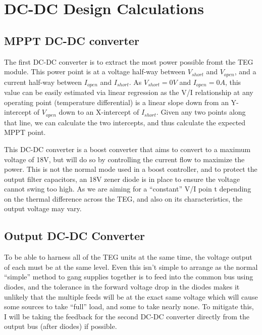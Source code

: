 \documentclass{report}
\begin{document}
\eject
\setcounter{page}{1}
\pagestyle{headings}

\setcounter{chapter}{0}
\renewcommand\chaptername{Chapter}
\renewcommand\thechapter{\arabic{chapter}}

\chapter{DC-DC Design Calculations}
\section{MPPT DC-DC converter}

The first DC-DC converter is to extract the most power possible fromt the TEG
module.  This power point is at a voltage half-way between $V_{short}$ and
$V_{open}$, and a current half-way between $I_{open}$ and $I_{short}$.  As
$V_{short} = 0V$ and $I_{open} = 0A$, this value can be easily estimated via
linear regression as the V/I relationship at any operating point (temperature
differential) is a linear slope down from an Y-intercept of $V_{open}$ down to
an X-intercept of $I_{short}$.  Given any two points along that line, we can
calculate the two intercepts, and thus calculate the expected MPPT point.

This DC-DC converter is a boost converter that aims to convert to a maximum
voltage of 18V, but will do so by controlling the current flow to maximize the
power.  This is not the normal mode used in a boost controller, and to protect
the output filter capacitors, an 18V zener diode is in place to ensure the 
voltage cannot swing too high.  As we are aiming for a ``constant'' V/I poin t
depending on the thermal difference across the TEG, and also on its
characteristics, the output voltage may vary.

\section{Output DC-DC Converter}

To be able to harness all of the TEG units at the same time, the voltage
output of each must be at the same level.  Even this isn't simple to arrange
as the normal ``simple'' method to gang supplies together is to feed into the
common bus using diodes, and the tolerance in the forward voltage drop in the
diodes makes it unlikely that the multiple feeds will be at the exact same
voltage which will cause some sources to take ``full'' load, and some to take
nearly none.  To mitigate this, I will be taking the feedback for the second
DC-DC converter directly from the output bus (after diodes) if possible.
\end{document}
